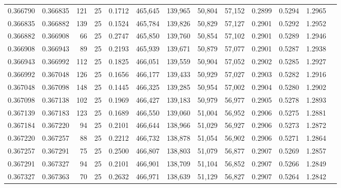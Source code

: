 \begin{tabular}{rrrrrrrrrrrrr}
0.366790 & 0.366835 &   121 &  25 &                                     0.1712 & 465,645 & 139,965 &  50,804 &  57,152 & 0.2899 & 0.5294 & 1.2965 \\
0.366835 & 0.366882 &   139 &  25 &                                     0.1524 & 465,784 & 139,826 &  50,829 &  57,127 & 0.2901 & 0.5292 & 1.2952 \\
0.366882 & 0.366908 &    66 &  25 &                                     0.2747 & 465,850 & 139,760 &  50,854 &  57,102 & 0.2901 & 0.5289 & 1.2946 \\
0.366908 & 0.366943 &    89 &  25 &                                     0.2193 & 465,939 & 139,671 &  50,879 &  57,077 & 0.2901 & 0.5287 & 1.2938 \\
0.366943 & 0.366992 &   112 &  25 &                                     0.1825 & 466,051 & 139,559 &  50,904 &  57,052 & 0.2902 & 0.5285 & 1.2927 \\
0.366992 & 0.367048 &   126 &  25 &                                     0.1656 & 466,177 & 139,433 &  50,929 &  57,027 & 0.2903 & 0.5282 & 1.2916 \\
0.367048 & 0.367098 &   148 &  25 &                                     0.1445 & 466,325 & 139,285 &  50,954 &  57,002 & 0.2904 & 0.5280 & 1.2902 \\
0.367098 & 0.367138 &   102 &  25 &                                     0.1969 & 466,427 & 139,183 &  50,979 &  56,977 & 0.2905 & 0.5278 & 1.2893 \\
0.367139 & 0.367183 &   123 &  25 &                                     0.1689 & 466,550 & 139,060 &  51,004 &  56,952 & 0.2906 & 0.5275 & 1.2881 \\
0.367184 & 0.367220 &    94 &  25 &                                     0.2101 & 466,644 & 138,966 &  51,029 &  56,927 & 0.2906 & 0.5273 & 1.2872 \\
0.367220 & 0.367257 &    88 &  25 &                                     0.2212 & 466,732 & 138,878 &  51,054 &  56,902 & 0.2906 & 0.5271 & 1.2864 \\
0.367257 & 0.367291 &    75 &  25 &                                     0.2500 & 466,807 & 138,803 &  51,079 &  56,877 & 0.2907 & 0.5269 & 1.2857 \\
0.367291 & 0.367327 &    94 &  25 &                                     0.2101 & 466,901 & 138,709 &  51,104 &  56,852 & 0.2907 & 0.5266 & 1.2849 \\
0.367327 & 0.367363 &    70 &  25 &                                     0.2632 & 466,971 & 138,639 &  51,129 &  56,827 & 0.2907 & 0.5264 & 1.2842 \\

\end{tabular}
